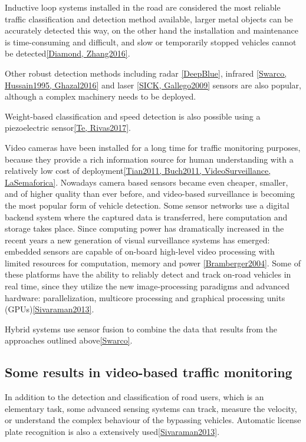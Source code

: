 Inductive loop systems installed in the road are considered the most reliable traffic classification and detection method available, larger metal objects can be accurately detected this way, on the other hand the installation and maintenance is time-consuming and difficult, and slow or temporarily stopped vehicles cannot be detected\ref{Diamond, Zhang2016}.

Other robust detection methods including radar \ref{DeepBlue}, infrared \ref{Swarco, Hussain1995, Ghazal2016} and laser \ref{SICK, Gallego2009} sensors are also popular, although a complex machinery needs to be deployed.

Weight-based classification and speed detection is also possible using a piezoelectric sensor\ref{Te, Rivas2017}.

Video cameras have been installed for a long time for traffic monitoring purposes, because they provide a rich information source for human understanding with a relatively low cost of deployment\ref{Tian2011, Buch2011, VideoSurveillance, LaSemaforica}.
Nowadays camera based sensors became even cheaper, smaller, and of higher quality than ever before, and video-based surveillance is becoming the most popular form of vehicle detection.
Some sensor networks use a digital backend system where the captured data is transferred, here computation and storage takes place.
Since computing power has dramatically increased in the recent years a new generation of visual surveillance systems has emerged: embedded sensors are capable of on-board high-level video processing with limited resources for computation, memory and power \ref{Bramberger2004}.
Some of these platforms have the ability to reliably detect and track on-road vehicles in real time, since they utilize the new image-processing paradigms and advanced hardware: parallelization, multicore processing and graphical processing units (GPUs)\ref{Sivaraman2013}.

Hybrid systems use sensor fusion to combine the data that results from the approaches outlined above\ref{Swarco}.

\subsection{Some results in video-based traffic monitoring}

In addition to the detection and classification of road users, which is an elementary task, some advanced sensing systems can track, measure the velocity, or understand the complex behaviour of the bypassing vehicles.
Automatic license plate recognition is also a extensively used\ref{Sivaraman2013}. 

